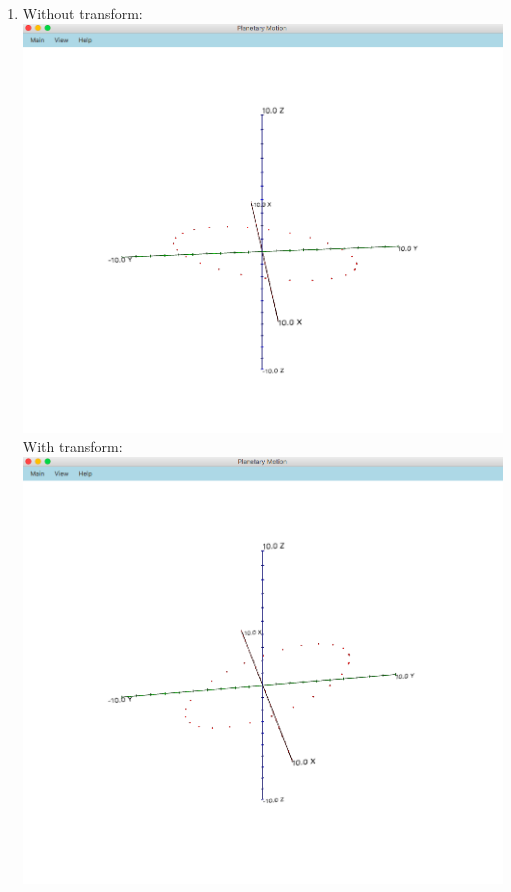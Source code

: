 \documentclass{article}
\begin{document}
\begin{enumerate}
\item Without transform:\\
\includegraphics[scale=0.3]{exercise24_without_transform}\\
With transform:\\
\includegraphics[scale=0.3]{exercise24_with_transform}


\end{enumerate}
\end{document}
